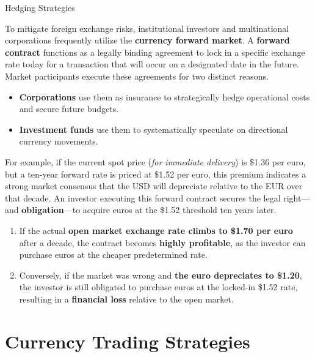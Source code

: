 \documentclass[10pt]{article}
\begin{document}
  \begin{core}{Hedging Strategies}

    To mitigate foreign exchange risks, institutional investors and multinational corporations frequently utilize the \textbf{currency forward market}. A \textbf{forward contract} functions as a legally binding agreement to lock in a specific exchange rate today for a transaction that will occur on a designated date in the future. Market participants execute these agreements for two distinct reasons.

    \begin{itemize}

      \item \textbf{Corporations} use them as insurance to strategically hedge operational costs and secure future budgets.

      \item \textbf{Investment funds} use them to systematically speculate on directional currency movements. 

    \end{itemize}

    For example, if the current spot price (\textit{for immediate delivery}) is \$1.36 per euro, but a ten-year forward rate is priced at \$1.52 per euro, this premium indicates a strong market consensus that the USD will depreciate relative to the EUR over that decade. An investor executing this forward contract secures the legal right---and \textbf{obligation}---to acquire euros at the \$1.52 threshold ten years later. 

    \begin{enumerate}

      \item If the actual \textbf{open market exchange rate climbs to \$1.70 per euro} after a decade, the contract becomes \textbf{highly profitable}, as the investor can purchase euros at the cheaper predetermined rate. 

      \item Conversely, if the market was wrong and \textbf{the euro depreciates to \$1.20}, the investor is still obligated to purchase euros at the locked-in \$1.52 rate, resulting in a \textbf{financial loss} relative to the open market.

    \end{enumerate}

  \end{core}

\section{Currency Trading Strategies}
\end{document}
